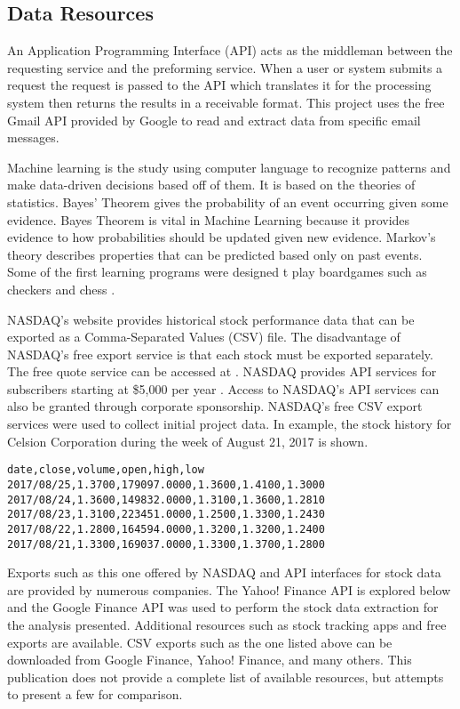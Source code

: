 \documentclass[sigconf]{acmart}
\begin{document}
\subsection{Data Resources}
An Application Programming Interface (API) acts as the middleman between the requesting service and the preforming service. When a user or system submits a request the request is passed to the API which translates it for the processing system then returns the results in a receivable format. This project uses the free Gmail API provided by Google to read and extract data from specific email messages.

Machine learning is the study using computer language to recognize patterns and make data-driven decisions based off of them. It is based on the theories of statistics. Bayes' Theorem gives the probability of an event occurring given some evidence. Bayes Theorem is vital in Machine Learning because it provides evidence to how probabilities should be updated given new evidence. Markov's theory describes properties that can be predicted based only on past events. Some of the first learning programs were designed t play boardgames such as checkers and chess \cite{www-wikiMachine}.

NASDAQ's website provides historical stock performance data that can be exported as a Comma-Separated Values (CSV) file. The disadvantage of NASDAQ's free export service is that each stock must be exported separately. The free quote service can be accessed at \cite{www-quotenasdaq}. NASDAQ provides API services for subscribers starting at \$5,000 per year \cite{www-nasdaq-sub}. Access to NASDAQ's API services can also be granted through corporate sponsorship. NASDAQ's free CSV export services were used to collect initial project data. In example, the stock history for Celsion Corporation during the week of August 21, 2017 is shown.

\begin{mdframed}[style=default]
\begin{lstlisting}
date,close,volume,open,high,low
2017/08/25,1.3700,179097.0000,1.3600,1.4100,1.3000
2017/08/24,1.3600,149832.0000,1.3100,1.3600,1.2810
2017/08/23,1.3100,223451.0000,1.2500,1.3300,1.2430
2017/08/22,1.2800,164594.0000,1.3200,1.3200,1.2400
2017/08/21,1.3300,169037.0000,1.3300,1.3700,1.2800
\end{lstlisting}
\end{mdframed} 

Exports such as this one offered by NASDAQ and API interfaces for stock data are provided by numerous companies. The Yahoo! Finance API is explored below and the Google Finance API was used to perform the stock data extraction for the analysis presented. Additional resources such as stock tracking apps and free exports are available. CSV exports such as the one listed above can be downloaded from Google Finance, Yahoo! Finance, and many others. This publication does not provide a complete list of available resources, but attempts to present a few for comparison. 
\end{document}
